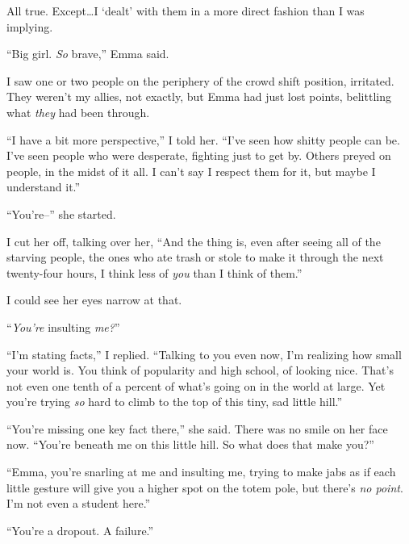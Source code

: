 All true.  Except\ldots I `dealt' with them in a more direct fashion than I was implying.



``Big girl.  \emph{So} brave,'' Emma said.



I saw one or two people on the periphery of the crowd shift position, irritated.  They weren't my allies, not exactly, but Emma had just lost points, belittling what \emph{they} had been through.



``I have a bit more perspective,'' I told her.  ``I've seen how shitty people can be.  I've seen people who were desperate, fighting just to get by.  Others preyed on people, in the midst of it all.  I can't say I respect them for it, but maybe I understand it.''



``You're--'' she started.



I cut her off, talking over her, ``And the thing is, even after seeing all of the starving people, the ones who ate trash or stole to make it through the next twenty-four hours, I think less of \emph{you} than I think of them.''



I could see her eyes narrow at that.



``\emph{You're }insulting\emph{ me?}''



``I'm stating facts,'' I replied.  ``Talking to you even now, I'm realizing how small your world is.  You think of popularity and high school, of looking nice.  That's not even one tenth of a percent of what's going on in the world at large.  Yet you're trying \emph{so} hard to climb to the top of this tiny, sad little hill.''



``You're missing one key fact there,'' she said.  There was no smile on her face now.  ``You're beneath me on this little hill.  So what does that make you?''



``Emma, you're snarling at me and insulting me, trying to make jabs as if each little gesture will give you a higher spot on the totem pole, but there's \emph{no point}.  I'm not even a student here.''



``You're a dropout.  A failure.''



